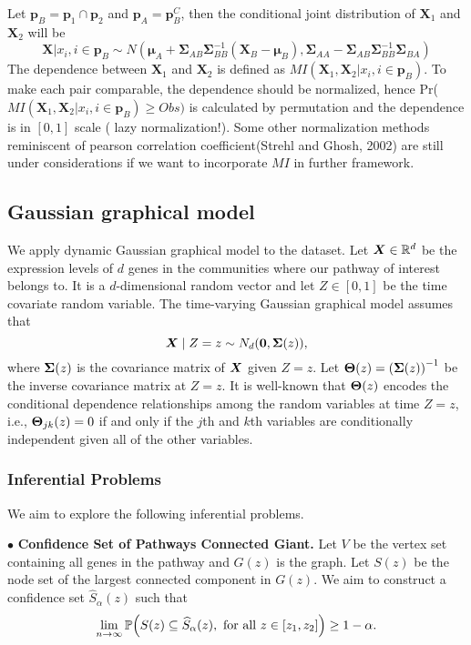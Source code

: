\documentclass[11pt]{article}
\begin{document}
Let $\bm{p}_{B} = \bm{p}_1 \cap \bm{p}_2$ and $\bm{p}_{A} = \bm{p}_{B}^C$, then the conditional joint distribution of $\bm{X}_1$ and $\bm{X}_2$ will be
\[
\bm{X}|{x_i, i\in\bm{p}_{B}} \sim N(\bm{\mu}_A + \bm{\Sigma}_{AB}\bm{\Sigma}_{BB}^{-1}(\bm{X}_B-\bm{\mu}_B), \bm{\Sigma}_{AA} - \bm{\Sigma}_{AB}\bm{\Sigma}_{BB}^{-1}\bm{\Sigma}_{BA})
\]
The dependence between $\bm{X}_1$ and $\bm{X}_2$ is defined as $MI(\bm{X}_1, \bm{X}_2|x_i, i \in \bm{p}_B)$. To make each pair comparable, the dependence should be normalized, hence Pr($MI(\bm{X}_1, \bm{X}_2|x_i, i \in \bm{p}_B) \geq Obs)$ is calculated by permutation and the dependence is in $[0, 1]$ scale ({\color{red} lazy normalization!}). Some other normalization methods reminiscent of pearson correlation coefficient(Strehl and Ghosh, 2002) are still under considerations if we want to incorporate $MI$ in further framework. 
\subsection{Gaussian graphical model}
We apply dynamic Gaussian graphical model to the dataset.  Let $\bm{X} \in \mathbb{R}^d$ be the expression levels
of $d$ genes in the communities where our pathway of interest belongs to. It is
 a $d$-dimensional random vector and let $Z\in [0,1]$ be the time covariate random variable.   The time-varying Gaussian graphical model assumes that 
\begin{equation}             
\label{Eq:timevarying GGM}
\bm{X} \mid Z = z \sim N_d(\mathbf{0},\bm{\Sigma}(z)),           
\end{equation}
where $\bm{\Sigma} (z)$ is the covariance matrix of $\bm{X}$ given $Z=z$. Let $\bm{\Theta} (z) = \left(\bm{\Sigma}(z)\right)^{-1}$ be the inverse covariance matrix at $Z=z$.  It is well-known that $\bm{\Theta} (z)$ encodes the conditional dependence relationships among the random variables at time $Z=z$, i.e., $\bm{\Theta}_{jk} (z) = 0 $ if and only if the $j$th and $k$th variables are conditionally independent given all of the other variables.

\subsubsection{Inferential Problems}

We aim to explore the following inferential problems. 

\noindent$\bullet$ {\bf Confidence Set of Pathways Connected Giant.} Let $V$ be the vertex set containing all genes in the pathway and $G(z)$ is the graph. Let $S(z)$ be the node set of the largest connected component in $G(z)$. We aim to construct a confidence set $\hat S_{\alpha}(z)$ such that 
\begin{align*}
  \lim_{n \rightarrow \infty}\mathbb{P}\Big(S(z) \subseteq \widehat S_{\alpha}(z), \text{ for all } z \in [z_1, z_2]\Big) \ge 1- \alpha.
\end{align*}
\end{document}
